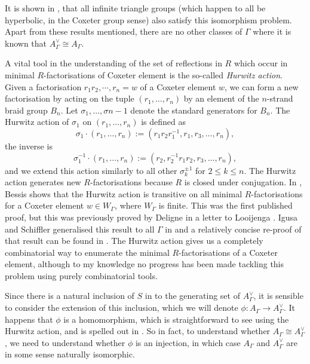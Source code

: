 It is shown in \cite{delucchi_etal_dual_2024}, that all infinite triangle groups (which happen to all be hyperbolic, in the Coxeter group sense) also satisfy this isomorphism problem.
Apart from these results mentioned, there are no other classes of $\Gamma$ where it is known that $A^\vee_\Gamma \cong A_\Gamma$.

A vital tool in the understanding of the set of reflections in $R$ which occur in minimal $R$-factorisations of Coxeter element is the so-called \emph{Hurwitz action}.
Given a factorisation $r_1r_2, \cdots ,r_n=w$ of a Coxeter element $w$, we can form a new factorisation by acting on the tuple  $(r_1, \ldots, r_n)$ by an element of the $n$-strand braid group  $B_n$.
Let  $\sigma_1, \ldots , \sigma{n-1}$ denote the standard generators for $B_n$.
The Hurwitz action of  $\sigma_1$ on  $(r_1, \ldots, r_n)$ is defined as
\[
	\sigma_1 \cdot (r_1, \ldots, r_n) := (r_1r_2r_1^{-1}, r_1, r_3, \ldots, r_n)
	,\]
the inverse is
\[
	\sigma_1^{-1} \cdot (r_1, \ldots, r_n) := (r_2, r_2^{-1}r_1r_2, r_3, \ldots, r_n)
	,\]
and we extend this action similarly to all other $\sigma_k^{\pm 1}$ for  $2\leq k \leq n$.
The Hurwitz action generates new  $R$-factorisations because  $R$ is closed under conjugation.
In \cite{bessis_dual_2003}, Bessis shows that the Hurwitz action is transitive on all minimal  $R$-factorisations for a Coxeter element  $w \in W_\Gamma$, where  $W_\Gamma$ is finite.
This was the first published proof, but this was previously proved by Deligne in a letter to Looijenga \cite{deligne_letter_1974}.
Igusa and Schiffler generalised this result to all $\Gamma$ in \cite{igusa_schiffler_exceptional_2010} and a relatively concise re-proof of that result can be found in \cite{baumeister_etal_note_2014}.
The Hurwitz action gives us a completely combinatorial way to enumerate the minimal $R$-factorisations of a Coxeter element, although to my knowledge no progress has been made tackling this problem using purely combinatorial tools.

Since there is a natural inclusion of $S$ in to the generating set of  $A^\vee_\Gamma$, it is sensible to consider the extension of this inclusion, which we will denote $\phi \colon A_\Gamma \to A^\vee_\Gamma$.
It happens that $\phi$ is a homomorphism, which is straightforward to see using the Hurwitz action, and is spelled out in \cite[Proposition 10.1]{mccammond_sulway_artin_2017}.
So in fact, to understand whether $A_\Gamma \cong A^\vee_\Gamma$, we need to understand whether $\phi$ is an injection, in which case $A_\Gamma$ and  $A^\vee_\Gamma$ are in some sense naturally isomorphic.

